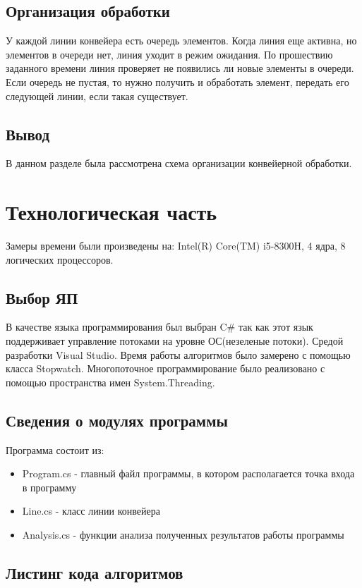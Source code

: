 \documentclass[12pt]{report}
\begin{document}
\section{Организация обработки}
У каждой линии конвейера есть очередь элементов. Когда линия еще активна, но элементов в очереди нет, линия уходит в режим ожидания.
По прошествию заданного времени линия проверяет не появились ли новые элементы в очереди. Если очередь не пустая, то нужно получить и обработать элемент, передать его следующей линии, если такая существует.

\section{Вывод}
В данном разделе была рассмотрена схема организации конвейерной обработки.

 

\chapter{Технологическая часть}
Замеры времени были произведены на: Intel(R) Core(TM) i5-8300H, 4 ядра, 8 логических процессоров.

\section{Выбор ЯП}
В качестве языка программирования был выбран C\# \cite{Microsoft} так как этот
язык поддерживает управление потоками на уровне ОС(незеленые потоки). Средой разработки Visual Studio. 
Время работы алгоритмов было замерено с помощью класса Stopwatch. Многопоточное программирование было
реализовано с помощью пространства имен System.Threading.

\section{Сведения о модулях программы}
Программа состоит из:
\begin{itemize}
	\item Program.cs - главный файл программы, в котором располагается точка входа в программу
	\item Line.cs - класс линии конвейера
	\item Analysis.cs - функции анализа полученных результатов работы программы
\end{itemize}


\section{Листинг кода алгоритмов}
\end{document}
